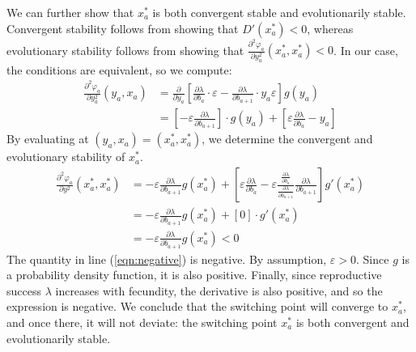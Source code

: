 \documentclass[titlepage, hidelinks, 12pt]{article}
\theoremstyle{plain}
\theoremstyle{remark}
\theoremstyle{definition}
\newcommand{\varSS}{\frac{\partial \lambda}{ \partial b_{a}}}
\newcommand{\varLL}{\frac{\partial \lambda}{ \partial b_{a+1}}}
\begin{document}
We can further show that $x_a^*$ 
is both convergent stable and evolutionarily stable. Convergent stability follows from showing that $D'(x_a^*) < 0$, whereas evolutionary
stability follows from showing that $\frac{\partial^2 \varphi_a}{\partial y_a^2}(x_a^*, x_a^*)< 0$. In our case, the conditions are equivalent,
so we compute:
\begin{align}
    \frac{\partial^2 \varphi_a}{\partial y_a^2}(y_a, x_a) &=\frac{\partial}{\partial y_a}\left[\varSS \cdot \varepsilon  - \varLL \cdot y_a\varepsilon \right] g(y_a)\\
    &= \left[ -\varepsilon \varLL \right]\cdot g(y_a) + \left[ \varepsilon \varSS - y_a \right]
\end{align}
By evaluating at $(y_a, x_a) = (x_a^*, x_a^*)$, we determine the convergent and evolutionary stability of $x_a^*$. 
\begin{align}
    \frac{\partial^2 \varphi_a}{\partial y^2}(x_a^*, x_a^*) &= -\varepsilon \varLL g(x_a^*) + \left[ \varepsilon \varSS - \varepsilon \frac{\varSS}{\varLL}
    \varLL\right]g'(x_a^*) \\
    &= -\varepsilon \varLL g(x_a^*) + \left[0  \right]\cdot g'(x_a^*)\\
    &= -\varepsilon\varLL g(x_a^*) < 0 \label{eqn:negative}
\end{align}
The quantity in line (\ref{eqn:negative}) is negative. By assumption, $\varepsilon > 0$. Since $g$ is a probability density function, it is also
positive. Finally, since reproductive success $\lambda$ increases with fecundity, the derivative is also positive, and so the expression is
negative. 
We conclude that the switching point will converge to $x_a^*$, and once there, it will not deviate: the switching point $x_a^*$ is both
convergent and evolutionarily stable. 
\end{document}
